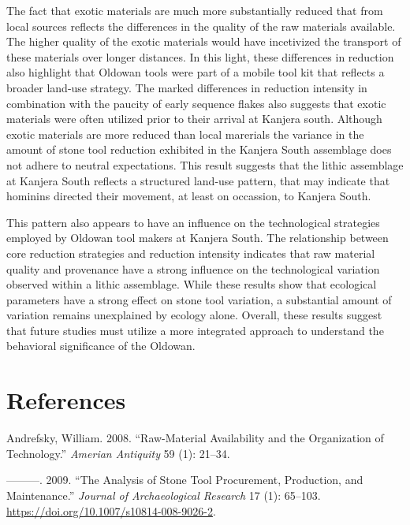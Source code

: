 \documentclass[]{elsarticle} %
\begin{document}
The fact that exotic materials are much more substantially reduced that
from local sources reflects the differences in the quality of the raw
materials available. The higher quality of the exotic materials would
have incetivized the transport of these materials over longer distances.
In this light, these differences in reduction also highlight that
Oldowan tools were part of a mobile tool kit that reflects a broader
land-use strategy. The marked differences in reduction intensity in
combination with the paucity of early sequence flakes also suggests that
exotic materials were often utilized prior to their arrival at Kanjera
south. Although exotic materials are more reduced than local marerials
the variance in the amount of stone tool reduction exhibited in the
Kanjera South assemblage does not adhere to neutral expectations. This
result suggests that the lithic assemblage at Kanjera South reflects a
structured land-use pattern, that may indicate that hominins directed
their movement, at least on occassion, to Kanjera South.

This pattern also appears to have an influence on the technological
strategies employed by Oldowan tool makers at Kanjera South. The
relationship between core reduction strategies and reduction intensity
indicates that raw material quality and provenance have a strong
influence on the technological variation observed within a lithic
assemblage. While these results show that ecological parameters have a
strong effect on stone tool variation, a substantial amount of variation
remains unexplained by ecology alone. Overall, these results suggest
that future studies must utilize a more integrated approach to
understand the behavioral significance of the Oldowan.

\hypertarget{references}{%
\section*{References}\label{references}}

\hypertarget{refs}{}
\leavevmode\hypertarget{ref-andrefskyRawMaterialAvailabilityOrganization2008}{}%
Andrefsky, William. 2008. ``Raw-Material Availability and the
Organization of Technology.'' \emph{Amerian Antiquity} 59 (1): 21--34.

\leavevmode\hypertarget{ref-andrefskyAnalysisStoneTool2009}{}%
---------. 2009. ``The Analysis of Stone Tool Procurement, Production,
and Maintenance.'' \emph{Journal of Archaeological Research} 17 (1):
65--103. \url{https://doi.org/10.1007/s10814-008-9026-2}.
\end{document}

